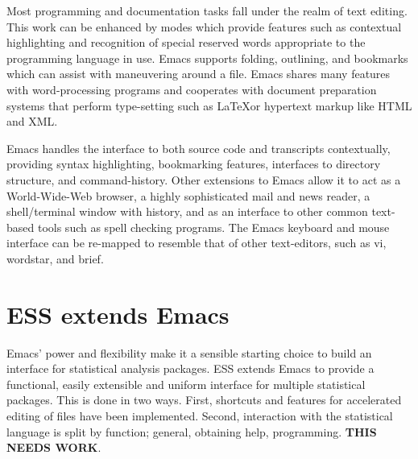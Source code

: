 \documentclass{article}
\begin{document}
Most programming and documentation tasks fall under the realm of text
editing.  This work can be enhanced by modes which provide features such
as contextual highlighting and recognition of special reserved words
appropriate to the programming language in use.  Emacs supports
folding, outlining, and bookmarks which can assist with maneuvering
around a file.  Emacs shares many features with word-processing
programs and cooperates with document preparation systems
that perform type-setting such as \LaTeX or hypertext markup
like HTML and XML.


 Emacs handles the
interface to both source code and transcripts contextually, providing
syntax highlighting, bookmarking features, interfaces to directory
structure, and command-history.  Other extensions to Emacs allow it to
act as a World-Wide-Web browser, a highly sophisticated mail and news
reader, a shell/terminal window with history, and as an interface to
other common text-based tools such as spell checking programs.  The
Emacs keyboard and mouse interface can be re-mapped to resemble that
of other text-editors, such as vi, wordstar, and brief.


\section{ESS extends Emacs}
\label{sec:ess-extends-emacs}

Emacs' power and flexibility make it a sensible starting choice to
build an interface for statistical analysis packages.  ESS extends
Emacs to provide a functional, easily extensible and uniform interface
for multiple statistical packages.  This is done in two ways.  First,
shortcuts and features for accelerated editing of files have been
implemented.  Second, interaction with the statistical
language is split by function; general, obtaining help, programming.
\textbf{THIS NEEDS WORK}.

\end{document}
